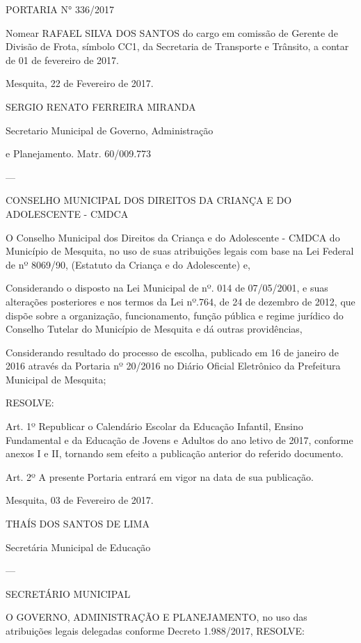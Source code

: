 \documentclass{doliberto}
\begin{document}
PORTARIA N° 336/2017 

Nomear  RAFAEL  SILVA  DOS  SANTOS  do  cargo  em 
comissão  de  Gerente  de  Divisão  de  Frota,  símbolo  CC1, 
da  Secretaria  de  Transporte  e  Trânsito,  a  contar  de  01 
de fevereiro de 2017. 

Mesquita, 22 de Fevereiro de 2017. 

SERGIO RENATO FERREIRA MIRANDA 

Secretario Municipal de Governo, Administração 

e  Planejamento. 
Matr. 60/009.773 

---

CONSELHO  MUNICIPAL  DOS  DIREITOS  DA  CRIANÇA  E 
DO ADOLESCENTE - CMDCA 

O  Conselho  Municipal  dos  Direitos  da  Criança  e  do 
Adolescente - CMDCA do Município de Mesquita, no uso de 
suas  atribuições  legais  com  base  na  Lei  Federal  de  nº 
8069/90, (Estatuto da Criança e do Adolescente) e, 

Considerando  o  disposto  na  Lei  Municipal  de  nº.  014  de 
07/05/2001, e suas alterações posteriores e nos termos da 
Lei nº.764, de 24 de dezembro de 2012, que dispõe sobre a 
organização,  funcionamento,  função  pública  e  regime 
jurídico do Conselho Tutelar do Município de Mesquita e dá 
outras providências, 

Considerando resultado do processo de escolha, publicado 
em  16  de  janeiro  de  2016  através  da  Portaria  nº  20/2016 
no  Diário  Oficial  Eletrônico  da  Prefeitura  Municipal  de 
Mesquita; 


RESOLVE:  
 
Art.  1º  Republicar  o  Calendário  Escolar  da  Educação 
Infantil,  Ensino  Fundamental  e  da  Educação  de  Jovens  e 
Adultos  do  ano  letivo  de  2017,  conforme  anexos  I  e  II, 
tornando  sem  efeito  a  publicação  anterior  do  referido 
documento.  
 
Art. 2º A presente Portaria entrará em vigor na data de sua 
publicação.  


Mesquita, 03 de Fevereiro de 2017. 

THAÍS DOS SANTOS DE LIMA 

Secretária Municipal de Educação 

---

SECRETÁRIO  MUNICIPAL 

O 
GOVERNO, 
ADMINISTRAÇÃO  E  PLANEJAMENTO,  no  uso  das 
atribuições legais delegadas conforme Decreto 1.988/2017, 
RESOLVE: 
\end{document}
